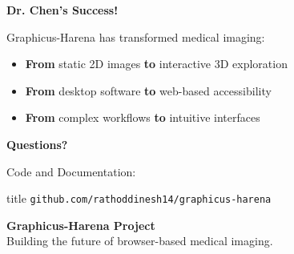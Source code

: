 \begin{frame}[plain]
\begin{center}
    \vspace{1.5cm}
    \LARGE \textbf{Dr. Chen's Success!}
    
    \vspace{0.5cm}
    \large
    Graphicus-Harena has transformed medical imaging:
    
    \vspace{0.5cm}
    \begin{itemize}
      \item \textbf{From} static 2D images \textbf{to} interactive 3D exploration
      \item \textbf{From} desktop software \textbf{to} web-based accessibility  
      \item \textbf{From} complex workflows \textbf{to} intuitive interfaces
    \end{itemize}
    
    \vspace{1cm}
    \normalsize
    \textbf{Questions?}
    
    \vspace{0.5cm}
    Code and Documentation:\\
    \begin{beamercolorbox}[sep=8pt,center,rounded=true]{title}
        \texttt{github.com/rathoddinesh14/graphicus-harena}
    \end{beamercolorbox}
    
    \vspace{0.5cm}
    \scriptsize
    \textbf{Graphicus-Harena Project} \\
    Building the future of browser-based medical imaging.
\end{center}
\end{frame}